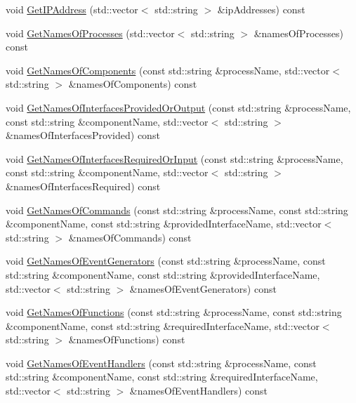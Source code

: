 \begin{DoxyCompactItemize}
\item 
void \hyperlink{classmts_manager_global_aabf5b3d4a303ea79fbd28d85721c7c13}{Get\+I\+P\+Address} (std\+::vector$<$ std\+::string $>$ \&ip\+Addresses) const 
\item 
void \hyperlink{classmts_manager_global_a79ff98c39ee4b67c0ae7d00c4381f18a}{Get\+Names\+Of\+Processes} (std\+::vector$<$ std\+::string $>$ \&names\+Of\+Processes) const 
\item 
void \hyperlink{classmts_manager_global_a5235e3495d9963069ed7ca53de040a31}{Get\+Names\+Of\+Components} (const std\+::string \&process\+Name, std\+::vector$<$ std\+::string $>$ \&names\+Of\+Components) const 
\item 
void \hyperlink{classmts_manager_global_a612adaf5ac9b1392b1ff467dcaa2f8b3}{Get\+Names\+Of\+Interfaces\+Provided\+Or\+Output} (const std\+::string \&process\+Name, const std\+::string \&component\+Name, std\+::vector$<$ std\+::string $>$ \&names\+Of\+Interfaces\+Provided) const 
\item 
void \hyperlink{classmts_manager_global_af83cc964e33db5d3b241239d922d8a82}{Get\+Names\+Of\+Interfaces\+Required\+Or\+Input} (const std\+::string \&process\+Name, const std\+::string \&component\+Name, std\+::vector$<$ std\+::string $>$ \&names\+Of\+Interfaces\+Required) const 
\item 
void \hyperlink{classmts_manager_global_a7d089967d11aa6e1b3786ea834b43fc5}{Get\+Names\+Of\+Commands} (const std\+::string \&process\+Name, const std\+::string \&component\+Name, const std\+::string \&provided\+Interface\+Name, std\+::vector$<$ std\+::string $>$ \&names\+Of\+Commands) const 
\item 
void \hyperlink{classmts_manager_global_a0cd6e7c9a0c3fdbbfdacdbdd03119a4b}{Get\+Names\+Of\+Event\+Generators} (const std\+::string \&process\+Name, const std\+::string \&component\+Name, const std\+::string \&provided\+Interface\+Name, std\+::vector$<$ std\+::string $>$ \&names\+Of\+Event\+Generators) const 
\item 
void \hyperlink{classmts_manager_global_ab8c6e3da89e4e76a3bdb29097e5d0a78}{Get\+Names\+Of\+Functions} (const std\+::string \&process\+Name, const std\+::string \&component\+Name, const std\+::string \&required\+Interface\+Name, std\+::vector$<$ std\+::string $>$ \&names\+Of\+Functions) const 
\item 
void \hyperlink{classmts_manager_global_a2d0ce773b7d8d71f775bec15ce5d9f1b}{Get\+Names\+Of\+Event\+Handlers} (const std\+::string \&process\+Name, const std\+::string \&component\+Name, const std\+::string \&required\+Interface\+Name, std\+::vector$<$ std\+::string $>$ \&names\+Of\+Event\+Handlers) const 

\end{DoxyCompactItemize}
